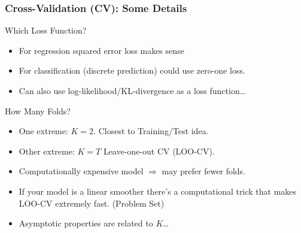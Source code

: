 \begin{frame}
  \frametitle{Cross-Validation (CV): Some Details}


  \begin{block}{Which Loss Function?}
  \small
    \vspace{-1em}
    \begin{itemize}
      \item For regression squared error loss makes sense \pause
      \item For classification (discrete prediction) could use zero-one loss. \pause
      \item Can also use log-likelihood/KL-divergence as a loss function\dots \pause
    \end{itemize}
  \end{block}

  \pause

    \vspace{-1em}

  \begin{block}{How Many Folds?}
    \small
    \vspace{-1em}
    \begin{itemize}
      \item One extreme: $K=2$. Closest to Training/Test idea. \pause
      \item Other extreme: $K=T$ \alert{Leave-one-out} CV (LOO-CV). \pause
      \item Computationally expensive model $\Rightarrow$ may prefer fewer folds. \pause
      \item If your model is a linear smoother there's a computational trick that makes LOO-CV extremely fast. (Problem Set) \pause
      \item Asymptotic properties are related to $K$\dots
    \end{itemize}
    
  \end{block}

\end{frame}
